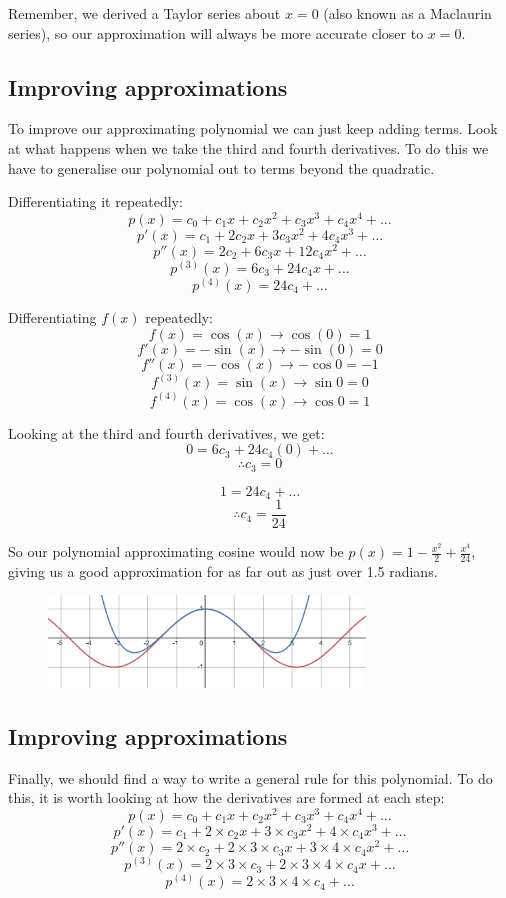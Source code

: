 \documentclass[../main.tex]{subfiles}
\begin{document}
Remember, we derived a Taylor series about $x=0$ (also known as a Maclaurin series), so our approximation will always be more accurate closer to $x=0$.

\subsection*{Improving approximations}
To improve our approximating polynomial we can just keep adding terms. Look at what happens when we take the third and fourth derivatives. To do this we have to generalise our polynomial out to terms beyond the quadratic.

Differentiating it repeatedly:
\[p(x) = c_0 + c_1x + c_2x^2 + c_3x^3 + c_4x^4 + \dots\]
\[p'(x) = c_1 + 2c_2x + 3c_3x^2 + 4c_4x^3 + \dots\]
\[p''(x) = 2c_2 + 6c_3x + 12c_4x^2 + \dots\]
\[p^{(3)}(x) = 6c_3 + 24c_4x + \dots\]
\[p^{(4)}(x) = 24c_4 + \dots\]

Differentiating $f(x)$ repeatedly:
\[f(x) = \cos{(x)} \rightarrow \cos{(0)}=1\]
\[f'(x) = -\sin{(x)} \rightarrow -\sin{(0)}=0\]
\[f''(x) = -\cos{(x)} \rightarrow -\cos{0}=-1\]
\[f^{(3)}(x) = \sin{(x)} \rightarrow \sin{0}=0\]
\[f^{(4)}(x) = \cos{(x)} \rightarrow \cos{0}=1\]

Looking at the third and fourth derivatives, we get:
\[0 = 6c_3 + 24c_4(0) + \dots\]
\[\therefore c_3 = 0\]

\[1 = 24c_4 + \dots\]
\[\therefore c_4 = \frac{1}{24}\]

So our polynomial approximating cosine would now be $p(x) = 1 - \frac{x^2}{2} + \frac{x^4}{24}$, giving us a good approximation for as far out as just over 1.5 radians.
\begin{figure}[h]
    \centering
    \includegraphics[width=0.75\textwidth]{images/taylorseries4.png}
\end{figure}

\subsection*{Improving approximations}
Finally, we should find a way to write a general rule for this polynomial. To do this, it is worth looking at how the derivatives are formed at each step:
\[p(x) = c_0 + c_1x + c_2x^2 + c_3x^3 + c_4x^4 + \dots\]
\[p'(x) = c_1 + 2\times c_2x + 3\times c_3x^2 + 4\times c_4x^3 + \dots\]
\[p''(x) = 2\times c_2 + 2\times 3\times c_3x + 3\times 4\times c_4x^2 + \dots\]
\[p^{(3)}(x) = 2\times 3\times c_3 + 2\times 3\times 4\times c_4x + \dots\]
\[p^{(4)}(x) = 2\times 3\times 4\times c_4 + \dots\]
\end{document}

